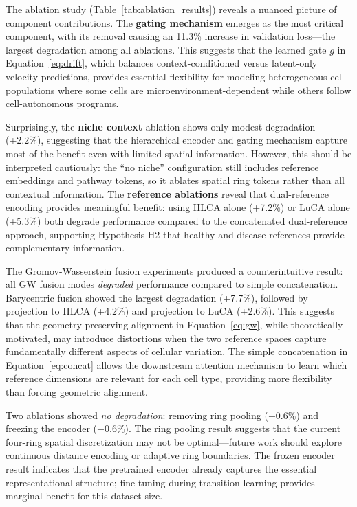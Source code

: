 \documentclass[conference]{IEEEtran}
\begin{document}
The ablation study (Table~\ref{tab:ablation_results}) reveals a nuanced picture of component contributions. The \textbf{gating mechanism} emerges as the most critical component, with its removal causing an 11.3\% increase in validation loss---the largest degradation among all ablations. This suggests that the learned gate $g$ in Equation~\ref{eq:drift}, which balances context-conditioned versus latent-only velocity predictions, provides essential flexibility for modeling heterogeneous cell populations where some cells are microenvironment-dependent while others follow cell-autonomous programs.

Surprisingly, the \textbf{niche context} ablation shows only modest degradation (+2.2\%), suggesting that the hierarchical encoder and gating mechanism capture most of the benefit even with limited spatial information. However, this should be interpreted cautiously: the ``no niche'' configuration still includes reference embeddings and pathway tokens, so it ablates spatial ring tokens rather than all contextual information. The \textbf{reference ablations} reveal that dual-reference encoding provides meaningful benefit: using HLCA alone (+7.2\%) or LuCA alone (+5.3\%) both degrade performance compared to the concatenated dual-reference approach, supporting Hypothesis H2 that healthy and disease references provide complementary information.

The Gromov-Wasserstein fusion experiments produced a counterintuitive result: all GW fusion modes \textit{degraded} performance compared to simple concatenation. Barycentric fusion showed the largest degradation (+7.7\%), followed by projection to HLCA (+4.2\%) and projection to LuCA (+2.6\%). This suggests that the geometry-preserving alignment in Equation~\ref{eq:gw}, while theoretically motivated, may introduce distortions when the two reference spaces capture fundamentally different aspects of cellular variation. The simple concatenation in Equation~\ref{eq:concat} allows the downstream attention mechanism to learn which reference dimensions are relevant for each cell type, providing more flexibility than forcing geometric alignment.

Two ablations showed \textit{no degradation}: removing ring pooling ($-0.6\%$) and freezing the encoder ($-0.6\%$). The ring pooling result suggests that the current four-ring spatial discretization may not be optimal---future work should explore continuous distance encoding or adaptive ring boundaries. The frozen encoder result indicates that the pretrained encoder already captures the essential representational structure; fine-tuning during transition learning provides marginal benefit for this dataset size.
\end{document}
